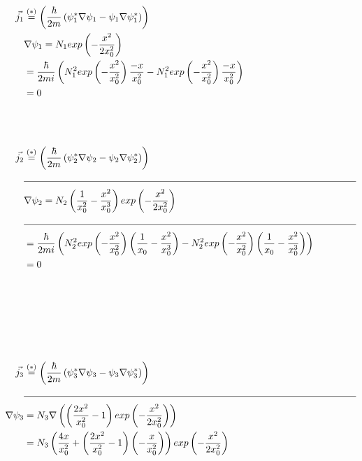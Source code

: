     \begin{align*}
        \vec{j_1} &\stackrel{(*)}{=} \left( \frac{\hbar}{2m} \left( \psi_1^* \nabla \psi_1 - \psi_1 \nabla \psi_1^* \right) \right)\\
        &\nabla \psi_1 = N_1 exp \left(-\frac{x^2}{2x_0^2} \right)\\
        &= \frac{\hbar}{2mi} \left( N_1^2 exp \left( -\frac{x^2}{x_0^2} \right) \frac{-x}{x_0^2} - N_1^2 exp\left( -\frac{x^2}{x_0^2} \right) \frac{-x}{x_0^2} \right)\\
        &= 0\\
        \\
        \\
        \\
        \vec{j_2} &\stackrel{(*)}{=} \left( \frac{\hbar}{2m} \left( \psi_2^* \nabla \psi_2 - \psi_2 \nabla \psi_2^* \right) \right)\\
        &\text{\noindent\makebox[\linewidth]{\rule{\linewidth}{0.4pt}}}\\
        &\nabla \psi_2 = N_2 \left( \frac{1}{x_0^2} - \frac{x^2}{x_0^3} \right) exp \left( - \frac{x^2}{2x_0^2} \right)\\
        &\text{\noindent\makebox[\linewidth]{\rule{\linewidth}{0.4pt}}}\\
        &= \frac{\hbar}{2mi} \left( N_2^2 exp \left( -\frac{x^2}{x_0^2} \right) \left( \frac{1}{x_0} - \frac{x^2}{x_0^3} \right) - N_2^2 exp \left( -\frac{x^2}{x_0^2} \right) \left( \frac{1}{x_0} - \frac{x^2}{x_0^3} \right)  \right)\\
        &= 0\\
        \\
        \\
        \\
        \\
        \\
        \\
        \vec{j_3} &\stackrel{(*)}{=} \left( \frac{\hbar}{2m} \left( \psi_3^* \nabla \psi_3 - \psi_3 \nabla \psi_3^* \right) \right)\\
        &\text{\noindent\makebox[\linewidth]{\rule{\linewidth}{0.4pt}}}\\
        \nabla \psi_3 &= N_3 \nabla \left( \left( \frac{2x^2}{x_0^2} -1 \right) exp \left( -\frac{x^2}{2x_0^2} \right) \right)\\
        &= N_3 \left( \frac{4x}{x_0^2} + \left( \frac{2x^2}{x_0^2} - 1 \right) \left( -\frac{x}{x_0^2} \right) \right) exp \left( -\frac{x^2}{2x_0^2} \right)\\

\end{align*}
